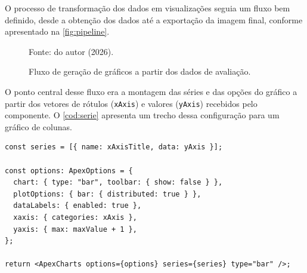 O processo de transformação dos dados em visualizações seguia um fluxo bem definido, desde a obtenção dos dados até a exportação da imagem final, conforme apresentado na \autoref{fig:pipeline}.

\begin{figure}[!htb]
\centering
\caption{Fluxo de geração de gráficos a partir dos dados de avaliação.}
\label{fig:pipeline}
\vspace{0.3cm}


\vspace{0.2cm}
{\footnotesize Fonte: do autor (2026).}
\end{figure}

O ponto central desse fluxo era a montagem das séries e das opções do gráfico a partir dos vetores de rótulos (\texttt{xAxis}) e valores (\texttt{yAxis}) recebidos pelo componente. O \autoref{cod:serie} apresenta um trecho dessa configuração para um gráfico de colunas.

\begin{lstlisting}[caption={Trecho da configuração de séries e opções de um gráfico com \textit{react-apexcharts}.}, label={cod:serie}]
const series = [{ name: xAxisTitle, data: yAxis }];

const options: ApexOptions = {
  chart: { type: "bar", toolbar: { show: false } },
  plotOptions: { bar: { distributed: true } },
  dataLabels: { enabled: true },
  xaxis: { categories: xAxis },
  yaxis: { max: maxValue + 1 },
};

return <ApexCharts options={options} series={series} type="bar" />;
\end{lstlisting}

